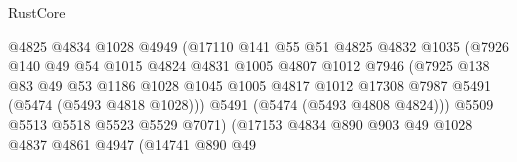\begin{lexlean}{RustCore}
\begin{coremodule}
                                    @4825
                                    @4834
                                    @1028
                                    @4949
                                    (@17110
                                      @141
                                      @55
                                      @51
                                      @4825
                                      @4832
                                      @1035
                                      (@7926
                                        @140
                                        @49
                                        @54
                                        @1015
                                        @4824
                                        @4831
                                        @1005
                                        @4807
                                        @1012
                                        @7946
                                        (@7925
                                          @138
                                          @83
                                          @49
                                          @53
                                          @1186
                                          @1028
                                          @1045
                                          @1005
                                          @4817
                                          @1012
                                          @17308
                                          @7987
                                          @5491
                                          (@5474 (@5493 @4818 @1028)))
                                        @5491
                                        (@5474 (@5493 @4808 @4824)))
                                      @5509
                                      @5513
                                      @5518
                                      @5523
                                      @5529
                                      @7071)
                                    (@17153
                                      @4834
                                      @890
                                      @903
                                      @49
                                      @1028
                                      @4837
                                      @4861
                                      @4947
                                      (@14741
                                        @890
                                        @49

\end{coremodule}
\end{lexlean}
